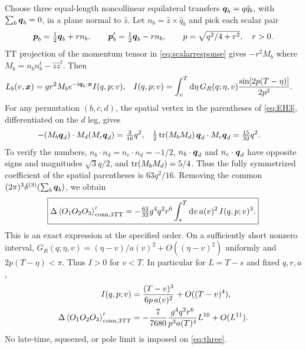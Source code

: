 Choose three equal-length noncollinear equilateral transfers \(\boldsymbol q_b=q\hat q_b\), with \(\sum_b\boldsymbol q_b=0\), in a plane normal to \(\hat z\). Let \(n_b=\hat z\times\hat q_b\) and pick each scalar pair
\begin{equation}
 \boldsymbol p_b=\tfrac12\boldsymbol q_b+r n_b,\qquad \boldsymbol p'_b=\tfrac12\boldsymbol q_b-r n_b,
 \qquad p=\sqrt{q^2/4+r^2},\quad r>0 .
 \label{eq:inplanesplit}
\end{equation}
TT projection of the momentum tensor in \eqref{eq:scalarresponse} gives \(-r^2 M_b\) where \(M_b=n_bn_b^t-\hat z\hat z^t\). Then
\begin{align}
 L_b(v,\boldsymbol x)&=g r^2 M_b e^{-\mathrm{i}\boldsymbol q_b\cdot\boldsymbol x} I(q,p;v),
 &
 I(q,p;v)&=\int_v^T\mathrm{d}\eta\,G_R(q;\eta,v)
                    \frac{\sin[2p(T-\eta)]}{2p^2}.
 \label{eq:leg}
\end{align}
For any permutation \((b,c,d)\), the spatial vertex in the parentheses of \eqref{eq:EH3}, differentiated on the \(d\) leg, gives
\begin{align}
 -(M_b\boldsymbol q_d)\cdot M_d(M_c\boldsymbol q_d)&=\tfrac{3}{16}q^2,
 &
 \tfrac12\operatorname{tr}(M_bM_d)\,\boldsymbol q_d\cdot M_c\boldsymbol q_d&=\tfrac{15}{32}q^2 .
 \label{eq:angular}
\end{align}
To verify the numbers, \(n_b\cdot n_d=n_c\cdot n_d=-1/2\), \(n_b\cdot\boldsymbol q_d\) and \(n_c\cdot\boldsymbol q_d\) have opposite signs and magnitudes \(\sqrt3q/2\), and \(\operatorname{tr}(M_bM_d)=5/4\). Thus the fully symmetrized coefficient of the spatial parentheses is \(63q^2/16\). Removing the common \((2\pi)^3\delta^{(3)}(\sum_b\boldsymbol q_b)\), we obtain
\begin{equation}
 \boxed{\displaystyle
 \Delta\left\langle O_1O_2O_3\right\rangle'_{\mathrm{conn},3\mathrm{TT}}
 =-\tfrac{63}{32}g^4q^2r^6
       \int_s^T\mathrm{d} v\,a(v)^2\, I(q,p;v)^3 .}
 \label{eq:three}
\end{equation}
This is an exact expression at the specified order. On a sufficiently short nonzero interval,
\(G_R(q;\eta,v)=(\eta-v)/a(v)^2+O((\eta-v)^2)\) uniformly and \(2p(T-\eta)<\pi\). Thus \(I>0\) for \(v<T\). In particular for \(L=T-s\) and fixed \(q,r,a\),
\begin{align}
 I(q,p;v)&=\frac{(T-v)^3}{6p\,a(v)^2}+O((T-v)^4),\\
 \Delta\left\langle O_1O_2O_3\right\rangle'_{\mathrm{conn},3\mathrm{TT}}
 &=-\frac{7}{7680}\frac{g^4 q^2r^6}{p^3a(T)^4}L^{10}
   +O(L^{11}).
 \label{eq:shortthree}
\end{align}
No late-time, squeezed, or pole limit is imposed on \eqref{eq:three}.

